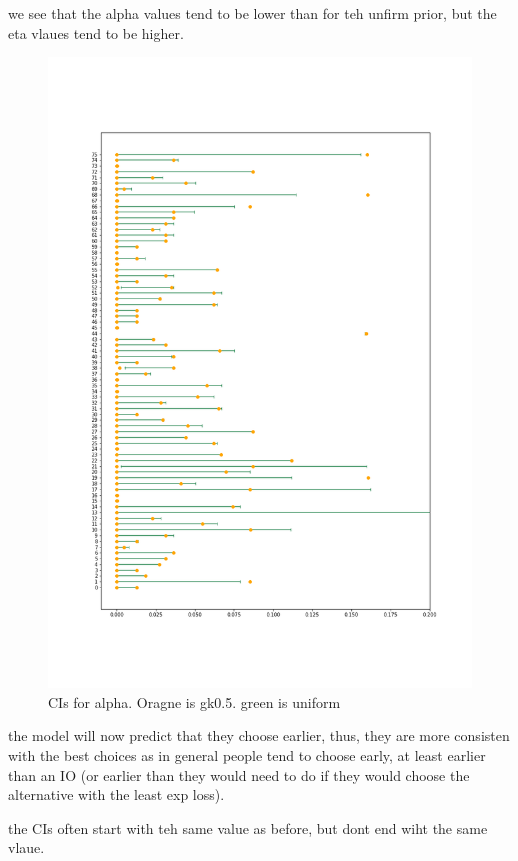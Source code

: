 we see that the alpha values tend to be lower than for teh unfirm prior, but the eta vlaues tend to be higher. 

\begin{figure}
    \centering
    \includegraphics[scale=0.37]{pictures/Sensitivity/ci_unlim_alpha.png}
    \caption{CIs for alpha. Oragne is gk0.5. green is uniform}
    \label{fig:sensitivity_unlim_cis_alpha}
\end{figure}


the model will now predict that they choose earlier, thus, they are more consisten with the best choices as in general people tend to choose early, at least earlier than an IO (or earlier than they would need to do if they would choose the alternative with the least exp loss). 


the CIs often start with teh same value as before, but dont end wiht the same vlaue.